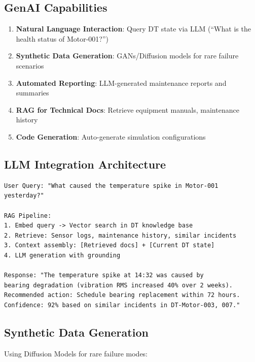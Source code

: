 \documentclass[12pt,a4paper]{article}
\begin{document}
\subsection{GenAI Capabilities}

\begin{tcolorbox}[colback=virtualpur!10, colframe=virtualpur, title=Generative AI Applications in Digital Twins]
\begin{enumerate}
    \item \textbf{Natural Language Interaction}: Query DT state via LLM (``What is the health status of Motor-001?'')
    \item \textbf{Synthetic Data Generation}: GANs/Diffusion models for rare failure scenarios
    \item \textbf{Automated Reporting}: LLM-generated maintenance reports and summaries
    \item \textbf{RAG for Technical Docs}: Retrieve equipment manuals, maintenance history
    \item \textbf{Code Generation}: Auto-generate simulation configurations
\end{enumerate}
\end{tcolorbox}

\subsection{LLM Integration Architecture}

\begin{lstlisting}[caption=LLM Query Interface for Digital Twin]
User Query: "What caused the temperature spike in Motor-001 yesterday?"

RAG Pipeline:
1. Embed query -> Vector search in DT knowledge base
2. Retrieve: Sensor logs, maintenance history, similar incidents
3. Context assembly: [Retrieved docs] + [Current DT state]
4. LLM generation with grounding

Response: "The temperature spike at 14:32 was caused by
bearing degradation (vibration RMS increased 40% over 2 weeks).
Recommended action: Schedule bearing replacement within 72 hours.
Confidence: 92% based on similar incidents in DT-Motor-003, 007."
\end{lstlisting}

\subsection{Synthetic Data Generation}

Using Diffusion Models for rare failure modes:
\end{document}
